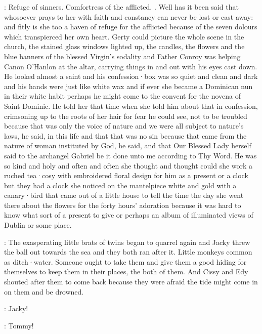 :
Refuge of sinners.
Comfortress of the afflicted.
.
Well has it been said
that whosoever
prays to her with faith and constancy
can never be lost or cast away:
and fitly
is she too a haven of refuge
for the afflicted
because of the seven dolours
which transpierced her own heart.
Gerty could picture
the whole scene in the church,
the stained glass
windows lighted up,
the candles,
the flowers
and the blue banners
of the blessed Virgin's sodality
and Father Conroy
was helping Canon O'Hanlon at the altar,
carrying things in and out
with his eyes cast down.
He looked almost a saint
and his confession·box
was so quiet and clean and dark
and his hands were just like white wax
and if ever she became
a Dominican nun in their white habit
perhaps he might come to the convent
for the novena of Saint Dominic.
He told her that time
when she told him about that in confession,
crimsoning up to the roots of her hair
for fear he could see,
not to be troubled
because that was only the voice of nature
and we were all subject to nature's laws,
he said,
in this life
and that that was no sin
because that came from
the nature of woman instituted by God,
he said,
and that Our Blessed Lady herself
said to the archangel Gabriel
be it done unto me
according to Thy Word.
He was so kind and holy
and often and often
she thought and thought
could she work a ruched tea·cosy
with embroidered floral design for him
as a present
or a clock
but they had a clock
she noticed on the mantelpiece
white and gold with a canary·bird
that came out of a little house
to tell the time
the day she went there
about the flowers
for the forty hours' adoration
because it was hard to know
what sort of a present to give
or perhaps
an album of illuminated views of Dublin
or some place.

:
The exasperating little brats of twins
began to quarrel again
and Jacky threw the ball out
towards the sea
and they both ran after it.
Little monkeys
common as ditch·water.
Someone ought to take them
and give them a good hiding for themselves
to keep them in their places,
the both of them.
And Cissy and Edy shouted after them
to come back
because they were afraid
the tide might come in on them
and be drowned.

\cissy:
Jacky!

\edy:
Tommy!

